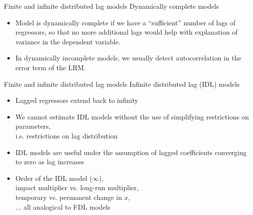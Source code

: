 \documentclass{beamer}
\begin{document}

\begin{frame}{Finite and infinite distributed lag models}
Dynamically complete models
\vspace{0.5cm}
\begin{itemize}
\item Model is dynamically complete if we have a ``sufficient'' number of lags of regressors, so that no more additional lags would help with explanation of variance in the dependent variable. 
\vspace{0.5cm}
\item In dynamically incomplete models, we usually detect autocorrelation in the error term of the LRM.
\end{itemize}
\end{frame}


\begin{frame}{Finite and infinite distributed lag models}
Infinite distributed lag (IDL) models
\begin{itemize}
\item Lagged regressors extend back to infinity
\item We cannot estimate IDL models without the use of simplifying restrictions on parameters, \\i.e. restrictions on lag distribution
\smallskip
\item IDL models are useful under the assumption of lagged coefficients converging to zero as lag increases
\smallskip
\item Order of the IDL model ($\infty$), 
\\impact multiplier vs. long-run multiplier, 
\\temporary vs. permanent change in $x$,
\\ $\dots$ all analogical to FDL models
\end{itemize}
\end{frame}

\end{document}
